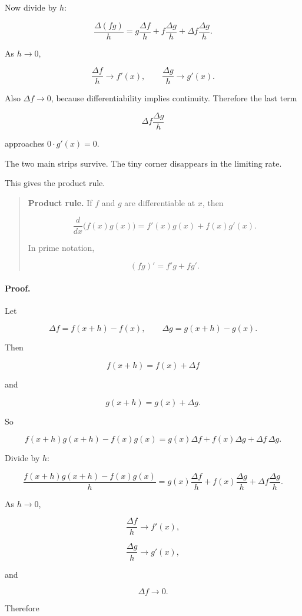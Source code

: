 Now divide by \(h\):

\[
\frac{\Delta(fg)}{h}
=
g\frac{\Delta f}{h}
+
f\frac{\Delta g}{h}
+
\Delta f\frac{\Delta g}{h}.
\]

As \(h\to0\),

\[
\frac{\Delta f}{h}\to f'(x),
\qquad
\frac{\Delta g}{h}\to g'(x).
\]

Also \(\Delta f\to0\), because differentiability implies continuity.  Therefore the last term

\[
\Delta f\frac{\Delta g}{h}
\]

approaches \(0\cdot g'(x)=0\).

The two main strips survive.  The tiny corner disappears in the limiting rate.

This gives the product rule.

\begin{quote}
\textbf{Product rule.}
If \(f\) and \(g\) are differentiable at \(x\), then

\[
\boxed{
\frac{d}{dx}\bigl(f(x)g(x)\bigr)
=
f'(x)g(x)+f(x)g'(x).
}
\]

In prime notation,

\[
\boxed{
(fg)'=f'g+fg'.
}
\]
\end{quote}

\paragraph{Proof.}
Let

\[
\Delta f=f(x+h)-f(x),
\qquad
\Delta g=g(x+h)-g(x).
\]

Then

\[
f(x+h)=f(x)+\Delta f
\]

and

\[
g(x+h)=g(x)+\Delta g.
\]

So

\[
f(x+h)g(x+h)-f(x)g(x)
=
g(x)\Delta f+f(x)\Delta g+\Delta f\,\Delta g.
\]

Divide by \(h\):

\[
\frac{f(x+h)g(x+h)-f(x)g(x)}{h}
=
g(x)\frac{\Delta f}{h}
+
f(x)\frac{\Delta g}{h}
+
\Delta f\frac{\Delta g}{h}.
\]

As \(h\to0\),

\[
\frac{\Delta f}{h}\to f'(x),
\]

\[
\frac{\Delta g}{h}\to g'(x),
\]

and

\[
\Delta f\to0.
\]

Therefore

